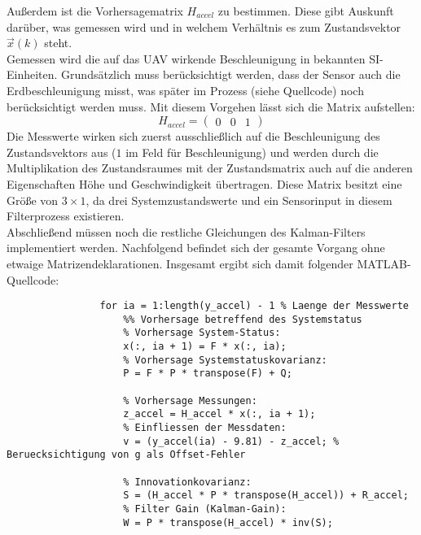 \documentclass[12pt,a4paper]{article}
\begin{document}
\begin{enumerate}[label=\textbf{\arabic*})]
\begin{enumerate}[label=\textbf{\alph*})]
			Außerdem ist die Vorhersagematrix $H_{accel}$ zu bestimmen. Diese gibt Auskunft darüber, was gemessen wird und in welchem Verhältnis es zum Zustandsvektor $\vec{x}(k)$ steht.\\
			Gemessen wird die auf das UAV wirkende Beschleunigung in bekannten SI-Einheiten. Grundsätzlich muss berücksichtigt werden, dass der Sensor auch die Erdbeschleunigung misst, was später im Prozess (siehe Quellcode) noch berücksichtigt werden muss. Mit diesem Vorgehen lässt sich die Matrix aufstellen:
			\begin{equation}\label{eq:Vorhersagematrix}
				H_{accel}=\begin{pmatrix}
				0 & 0 & 1
				\end{pmatrix}	
			\end{equation}
			Die Messwerte wirken sich zuerst ausschließlich auf die Beschleunigung des Zustandsvektors aus ($1$ im Feld für Beschleunigung) und werden durch die Multiplikation des Zustandsraumes mit der Zustandsmatrix auch auf die anderen Eigenschaften Höhe und Geschwindigkeit übertragen. Diese Matrix besitzt eine Größe von $3\times1$, da drei Systemzustandswerte und ein Sensorinput in diesem Filterprozess existieren.\\
			
			Abschließend müssen noch die restliche Gleichungen des Kalman-Filters implementiert werden. Nachfolgend befindet sich der gesamte Vorgang ohne etwaige Matrizendeklarationen. Insgesamt ergibt sich damit folgender MATLAB-Quellcode:
			\begin{lstlisting}
				for ia = 1:length(y_accel) - 1 % Laenge der Messwerte
					%% Vorhersage betreffend des Systemstatus
					% Vorhersage System-Status:
					x(:, ia + 1) = F * x(:, ia);
					% Vorhersage Systemstatuskovarianz:
					P = F * P * transpose(F) + Q;
					
					% Vorhersage Messungen:
					z_accel = H_accel * x(:, ia + 1);
					% Einfliessen der Messdaten:
					v = (y_accel(ia) - 9.81) - z_accel; % Beruecksichtigung von g als Offset-Fehler
					
					% Innovationkovarianz:
					S = (H_accel * P * transpose(H_accel)) + R_accel;
					% Filter Gain (Kalman-Gain):
					W = P * transpose(H_accel) * inv(S);
					

\end{lstlisting}
\end{enumerate}
\end{enumerate}
\end{document}
